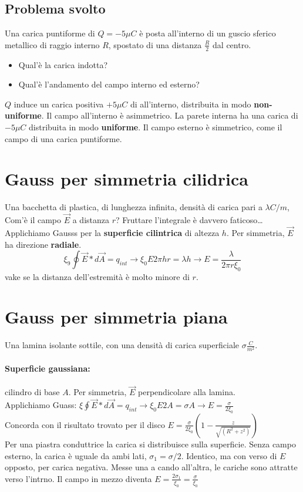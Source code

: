 \documentclass{book}
\begin{document}
\subsection{Problema svolto}
Una carica puntiforme di $Q=-5\mu C$ è posta all'interno di un guscio sferico metallico di raggio interno $R$, spostato di una distanza $\frac{R}{2}$ dal centro.
\begin{itemize}
\item Qual'è la carica indotta?
\item Qual'è l'andamento del campo interno ed esterno?
\end{itemize}
$Q$ induce un carica positiva $+5\mu C$ di all'interno, distribuita in modo \textbf{non-uniforme}.
Il campo all'interno è asimmetrico. La parete interna ha una carica di $-5\mu C$ distribuita in modo \textbf{uniforme}. Il campo esterno è simmetrico, come il campo di una carica puntiforme.
\section{Gauss per simmetria cilidrica}
Una bacchetta di plastica, di lunghezza infinita, densità di carica pari a $\lambda C/m$, Com'è il campo $\vec{E}$ a distanza $r$? Fruttare l'integrale è davvero faticoso\dots Applichiamo Gausss per la \textbf{superficie cilintrica} di altezza $h$. Per simmetria, $\vec{E}$ ha direzione \textbf{radiale}.
\begin{equation}
\xi_9\oint \vec{E}*d\vec{A}=q_{int}\to \xi_0 E2\pi hr=\lambda h\to E=\frac{\lambda}{2\pi r\xi_0}
\end{equation}
vake se la distanza dell'estremità è molto minore di $r$.
\section{Gauss per simmetria piana}
Una lamina isolante sottile, con una densità di carica superficiale $\sigma \frac{C}{m^2}$.
\paragraph{Superficie gaussiana:} cilindro di base $A$. Per simmetria, $\vec{E}$ perpendicolare alla lamina.\\ Applichiamo Guass: $\xi \oint \vec{E}*d\vec{A}=q_{int} \to \xi_0E2A=\sigma A\to E=\frac{\sigma}{2\xi_0}$\\
Concorda con il risultato trovato per il disco $E=\frac{\sigma}{2\xi_0}\left(1-\frac{z}{\sqrt{(R^2+z^2)}}\right)$\\
Per una piastra conduttrice la carica si distribuisce sulla superficie. Senza campo esterno, la carica è uguale da ambi lati, $\sigma_1=\sigma/2$. Identico, ma con verso di $E$ opposto, per carica negativa. Messe una a cando all'altra, le cariche sono attratte verso l'intrno. Il campo in mezzo diventa $E=\frac{2\sigma_1}{\xi_0}=\frac{\sigma}{\xi_0}$
\end{document}
